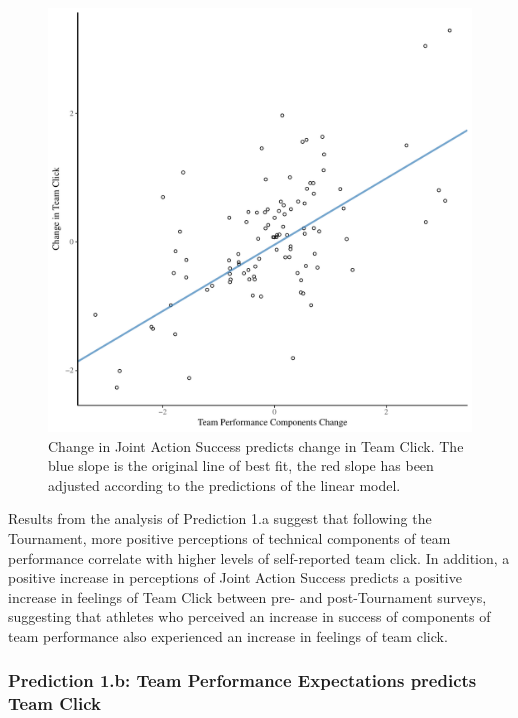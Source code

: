 \begin{landscape}


\begin{figure}[htbp]
\includegraphics[width = \linewidth]{images/jasClickDeltaModelSlope}
  \caption{Change in Joint Action Success predicts change in Team Click. The blue slope is the original line of best fit, the red slope has been adjusted according to the predictions of the linear model.}
  \label{fig:jasClickDeltaModelSLope}
\end{figure}

Results from the analysis of Prediction 1.a suggest that following the Tournament, more positive perceptions of technical components of team performance correlate with higher levels of self-reported team click.  In addition, a positive increase in perceptions of Joint Action Success predicts a positive increase in feelings of Team Click between pre- and post-Tournament surveys, suggesting that athletes who perceived an increase in success of components of team performance also experienced an increase in feelings of team click.






\subsubsection{Prediction 1.b: Team Performance Expectations predicts Team Click}


\end{landscape}
